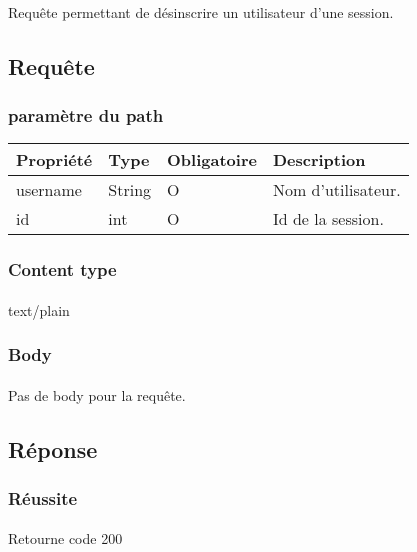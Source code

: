 \paragraph{}
	Requête permettant de désinscrire un utilisateur d'une session.

\subsection{Requête}
	\subsubsection{paramètre du path}
		\begin{center}
			\begin{tabularx}{\textwidth}{| T{0.2122\textwidth} | S{0.22\textwidth} | S{0.15\textwidth} | S{0.3\textwidth} |}
				\hline
				Propriété & Type & Obligatoire & Description \\
				\hline
				username & String & O & Nom d'utilisateur. \\
				\hline
				id & int & O & Id de la session. \\
				\hline
			\end{tabularx}
		\end{center}
		
	\subsubsection{Content type}
		\paragraph{}
			text/plain
			
	\subsubsection{Body}
		\paragraph{}
			Pas de body pour la requête.

\subsection{Réponse}
	\subsubsection{Réussite}
		\paragraph{}
			Retourne code 200
			
